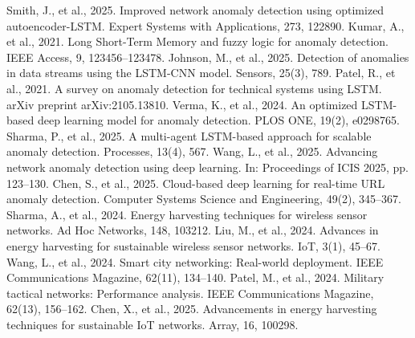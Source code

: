 \documentclass[preprint]{elsarticle}
\begin{document}
\begin{thebibliography}{30}
 Smith, J., et al., 2025. Improved network anomaly detection using optimized autoencoder-LSTM. Expert Systems with Applications, 273, 122890.
 Kumar, A., et al., 2021. Long Short-Term Memory and fuzzy logic for anomaly detection. IEEE Access, 9, 123456--123478.
 Johnson, M., et al., 2025. Detection of anomalies in data streams using the LSTM-CNN model. Sensors, 25(3), 789.
 Patel, R., et al., 2021. A survey on anomaly detection for technical systems using LSTM. arXiv preprint arXiv:2105.13810.
 Verma, K., et al., 2024. An optimized LSTM-based deep learning model for anomaly detection. PLOS ONE, 19(2), e0298765.
 Sharma, P., et al., 2025. A multi-agent LSTM-based approach for scalable anomaly detection. Processes, 13(4), 567.
 Wang, L., et al., 2025. Advancing network anomaly detection using deep learning. In: Proceedings of ICIS 2025, pp. 123--130.
 Chen, S., et al., 2025. Cloud-based deep learning for real-time URL anomaly detection. Computer Systems Science and Engineering, 49(2), 345--367.
 Sharma, A., et al., 2024. Energy harvesting techniques for wireless sensor networks. Ad Hoc Networks, 148, 103212.
 Liu, M., et al., 2024. Advances in energy harvesting for sustainable wireless sensor networks. IoT, 3(1), 45--67.
 Wang, L., et al., 2024. Smart city networking: Real-world deployment. IEEE Communications Magazine, 62(11), 134--140.
 Patel, M., et al., 2024. Military tactical networks: Performance analysis. IEEE Communications Magazine, 62(13), 156--162.
 Chen, X., et al., 2025. Advancements in energy harvesting techniques for sustainable IoT networks. Array, 16, 100298.
\end{thebibliography}
\end{document}
